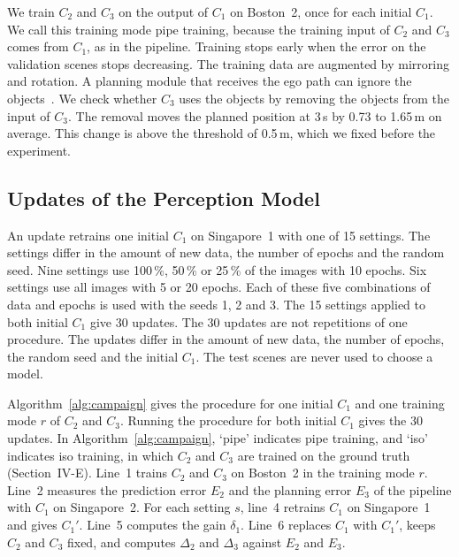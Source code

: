 \documentclass[conference]{IEEEtran}
\begin{document}
We train $C_2$ and $C_3$ on the output of $C_1$ on Boston~2, once for each initial $C_1$. We call this training mode pipe training, because the training input of $C_2$ and $C_3$ comes from $C_1$, as in the pipeline. Training stops early when the error on the validation scenes stops decreasing. The training data are augmented by mirroring and rotation. A planning module that receives the ego path can ignore the objects~\cite{li2024egostatus}. We check whether $C_3$ uses the objects by removing the objects from the input of $C_3$. The removal moves the planned position at 3\,s by 0.73 to 1.65\,m on average. This change is above the threshold of 0.5\,m, which we fixed before the experiment.

\subsection{Updates of the Perception Model}
An update retrains one initial $C_1$ on Singapore~1 with one of 15 settings. The settings differ in the amount of new data, the number of epochs and the random seed. Nine settings use 100\,\%, 50\,\% or 25\,\% of the images with 10 epochs. Six settings use all images with 5 or 20 epochs. Each of these five combinations of data and epochs is used with the seeds 1, 2 and 3. The 15 settings applied to both initial $C_1$ give 30 updates. The 30 updates are not repetitions of one procedure. The updates differ in the amount of new data, the number of epochs, the random seed and the initial $C_1$. The test scenes are never used to choose a model.

Algorithm~\ref{alg:campaign} gives the procedure for one initial $C_1$ and one training mode $r$ of $C_2$ and $C_3$. Running the procedure for both initial $C_1$ gives the 30 updates. In Algorithm~\ref{alg:campaign}, `pipe' indicates pipe training, and `iso' indicates iso training, in which $C_2$ and $C_3$ are trained on the ground truth (Section~IV-E). Line~1 trains $C_2$ and $C_3$ on Boston~2 in the training mode $r$. Line~2 measures the prediction error $E_2$ and the planning error $E_3$ of the pipeline with $C_1$ on Singapore~2. For each setting $s$, line~4 retrains $C_1$ on Singapore~1 and gives $C_1'$. Line~5 computes the gain $\delta_1$. Line~6 replaces $C_1$ with $C_1'$, keeps $C_2$ and $C_3$ fixed, and computes $\Delta_2$ and $\Delta_3$ against $E_2$ and $E_3$.
\end{document}
